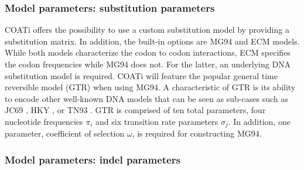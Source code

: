 \subsubsection{Model parameters: substitution parameters}
COATi offers the possibility to use a custom substitution model by providing a
substitution matrix.
In addition, the built-in options are MG94 and ECM models.
While both models characterize the codon to codon interactions, ECM specifies
the codon frequencies while MG94 does not.
For the latter, an underlying DNA substitution model is required.
COATi will feature the popular general time reversible model (GTR)
\parencite{tavare_gtr_1986} when using MG94.
A characteristic of GTR is its ability to encode other well-known DNA models
that can be seen as sub-cases such as JC69 \parencite{jukes1969mammalian},
HKY \parencite{hasegawa1985dating}, or TN93 \parencite{tamura1993estimation}.
GTR is comprised of ten total parameters, four nucleotide frequencies $\pi_i$
and six transition rate parameters $\sigma_j$.
In addition, one parameter, coefficient of selection $\omega$, is required for
constructing MG94.



\subsubsection{Model parameters: indel parameters}

